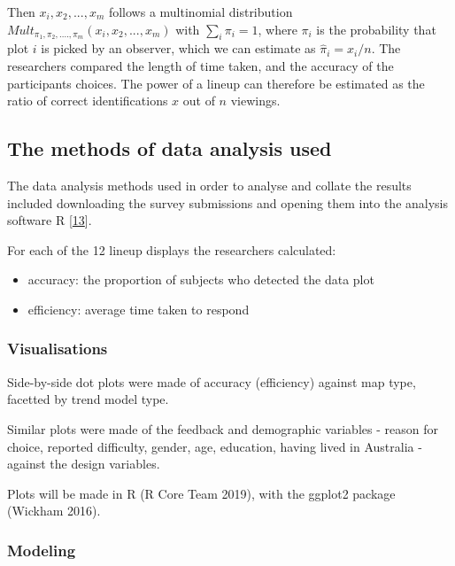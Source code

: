 \documentclass[conference,final,]{IEEEtran}
\providecommand{\tightlist}{%
  \setlength{\itemsep}{0pt}\setlength{\parskip}{0pt}}
\begin{document}
Then \(x_i, x_2, ..., x_m\) follows a multinomial
distribution\(Mult_{\pi_1, \pi_2, ...., \pi_m}(x_i, x_2, ..., x_m)\) with
\(\sum_i \pi_i = 1\), where \(\pi_i\) is the probability that plot \(i\) is picked by an
observer, which we can estimate as \(\hat{\pi}_i = x_i/n\).
The researchers compared the length of time taken, and the accuracy of the participants choices.
The power of a lineup can therefore be estimated as the ratio of correct
identifications \(x\) out of \(n\) viewings.

\hypertarget{the-methods-of-data-analysis-used}{%
\subsection{The methods of data analysis used}\label{the-methods-of-data-analysis-used}}

The data analysis methods used in order to analyse and collate the results included downloading the survey submissions and opening them into the analysis software R {[}\protect\hyperlink{ref-RCore}{13}{]}.

For each of the 12 lineup displays the researchers calculated:

\begin{itemize}
\tightlist
\item
  accuracy: the proportion of subjects who detected the data plot
\item
  efficiency: average time taken to respond
\end{itemize}

\hypertarget{visualisations}{%
\subsubsection{Visualisations}\label{visualisations}}

Side-by-side dot plots were made of accuracy (efficiency) against map type, facetted by trend model type.

Similar plots were made of the feedback and demographic variables - reason for choice, reported difficulty, gender, age, education, having lived in Australia - against the design variables.

Plots will be made in R (R Core Team 2019), with the ggplot2 package (Wickham 2016).

\hypertarget{modeling}{%
\subsubsection{Modeling}\label{modeling}}
\end{document}
